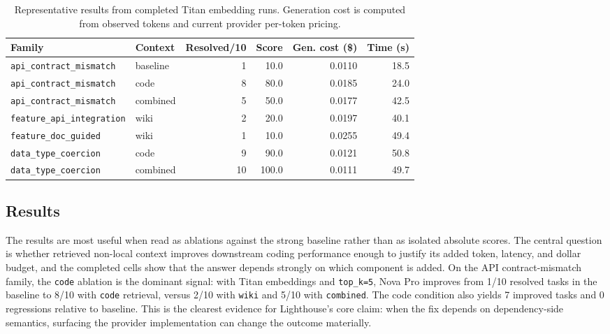 \documentclass[a4paper,12pt]{article}
\begin{document}
\begin{table}[t]
\centering
\small
\caption{Representative results from completed Titan embedding runs. Generation cost is computed from observed tokens and current provider per-token pricing.}
\label{tab:main-results}
\begin{tabular}{l l r r r r}
\hline
Family & Context & Resolved/10 & Score & Gen. cost (\$) & Time (s) \\
\hline
\texttt{api\_contract\_mismatch} & baseline & 1 & 10.0 & 0.0110 & 18.5 \\
\texttt{api\_contract\_mismatch} & code & 8 & 80.0 & 0.0185 & 24.0 \\
\texttt{api\_contract\_mismatch} & combined & 5 & 50.0 & 0.0177 & 42.5 \\
\texttt{feature\_api\_integration} & wiki & 2 & 20.0 & 0.0197 & 40.1 \\
\texttt{feature\_doc\_guided} & wiki & 1 & 10.0 & 0.0255 & 49.4 \\
\texttt{data\_type\_coercion} & code & 9 & 90.0 & 0.0121 & 50.8 \\
\texttt{data\_type\_coercion} & combined & 10 & 100.0 & 0.0111 & 49.7 \\
\hline
\end{tabular}
\end{table}

\subsection{Results}

The results are most useful when read as ablations against the strong baseline rather than as isolated absolute scores. The central question is whether retrieved non-local context improves downstream coding performance enough to justify its added token, latency, and dollar budget, and the completed cells show that the answer depends strongly on which component is added. On the API contract-mismatch family, the \texttt{code} ablation is the dominant signal: with Titan embeddings and \texttt{top\_k=5}, Nova Pro improves from 1/10 resolved tasks in the baseline to 8/10 with \texttt{code} retrieval, versus 2/10 with \texttt{wiki} and 5/10 with \texttt{combined}. The code condition also yields 7 improved tasks and 0 regressions relative to baseline. This is the clearest evidence for Lighthouse's core claim: when the fix depends on dependency-side semantics, surfacing the provider implementation can change the outcome materially.\\
\end{document}
